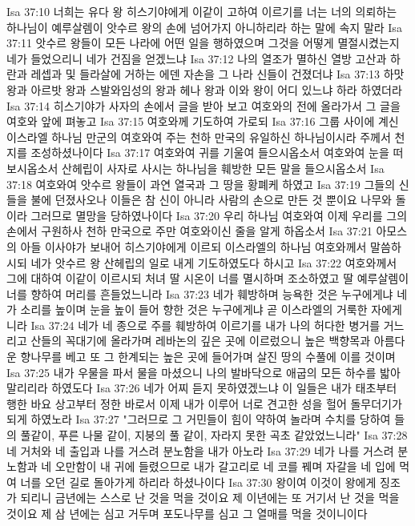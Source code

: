 Isa 37:10  너희는 유다 왕 히스기야에게 이같이 고하여 이르기를 너는 너의 의뢰하는 하나님이 예루살렘이 앗수르 왕의 손에 넘어가지 아니하리라 하는 말에 속지 말라
Isa 37:11  앗수르 왕들이 모든 나라에 어떤 일을 행하였으며 그것을 어떻게 멸절시켰는지 네가 들었으리니 네가 건짐을 얻겠느냐
Isa 37:12  나의 열조가 멸하신 열방 고산과 하란과 레셉과 및 들라살에 거하는 에덴 자손을 그 나라 신들이 건졌더냐
Isa 37:13  하맛 왕과 아르밧 왕과 스발와임성의 왕과 헤나 왕과 이와 왕이 어디 있느냐 하라 하였더라
Isa 37:14  히스기야가 사자의 손에서 글을 받아 보고 여호와의 전에 올라가서 그 글을 여호와 앞에 펴놓고
Isa 37:15  여호와께 기도하여 가로되
Isa 37:16  그룹 사이에 계신 이스라엘 하나님 만군의 여호와여 주는 천하 만국의 유일하신 하나님이시라 주께서 천지를 조성하셨나이다
Isa 37:17  여호와여 귀를 기울여 들으시옵소서 여호와여 눈을 떠 보시옵소서 산헤립이 사자로 사시는 하나님을 훼방한 모든 말을 들으시옵소서
Isa 37:18  여호와여 앗수르 왕들이 과연 열국과 그 땅을 황폐케 하였고
Isa 37:19  그들의 신들을 불에 던졌사오나 이들은 참 신이 아니라 사람의 손으로 만든 것 뿐이요 나무와 돌이라 그러므로 멸망을 당하였나이다
Isa 37:20  우리 하나님 여호와여 이제 우리를 그의 손에서 구원하사 천하 만국으로 주만 여호와이신 줄을 알게 하옵소서
Isa 37:21  아모스의 아들 이사야가 보내어 히스기야에게 이르되 이스라엘의 하나님 여호와께서 말씀하시되 네가 앗수르 왕 산헤립의 일로 내게 기도하였도다 하시고
Isa 37:22  여호와께서 그에 대하여 이같이 이르시되 처녀 딸 시온이 너를 멸시하며 조소하였고 딸 예루살렘이 너를 향하여 머리를 흔들었느니라
Isa 37:23  네가 훼방하며 능욕한 것은 누구에게냐 네가 소리를 높이며 눈을 높이 들어 향한 것은 누구에게냐 곧 이스라엘의 거룩한 자에게니라
Isa 37:24  네가 네 종으로 주를 훼방하여 이르기를 내가 나의 허다한 병거를 거느리고 산들의 꼭대기에 올라가며 레바논의 깊은 곳에 이르렀으니 높은 백향목과 아름다운 향나무를 베고 또 그 한계되는 높은 곳에 들어가며 살진 땅의 수풀에 이를 것이며
Isa 37:25  내가 우물을 파서 물을 마셨으니 나의 발바닥으로 애굽의 모든 하수를 밟아 말리리라 하였도다
Isa 37:26  네가 어찌 듣지 못하였겠느냐 이 일들은 내가 태초부터 행한 바요 상고부터 정한 바로서 이제 내가 이루어 너로 견고한 성을 헐어 돌무더기가 되게 하였노라
Isa 37:27  "그러므로 그 거민들이 힘이 약하여 놀라며 수치를 당하여 들의 풀같이, 푸른 나물 같이, 지붕의 풀 같이, 자라지 못한 곡초 같았었느니라"
Isa 37:28  네 거처와 네 출입과 나를 거스려 분노함을 내가 아노라
Isa 37:29  네가 나를 거스려 분노함과 네 오만함이 내 귀에 들렸으므로 내가 갈고리로 네 코를 꿰며 자갈을 네 입에 먹여 너를 오던 길로 돌아가게 하리라 하셨나이다
Isa 37:30  왕이여 이것이 왕에게 징조가 되리니 금년에는 스스로 난 것을 먹을 것이요 제 이년에는 또 거기서 난 것을 먹을 것이요 제 삼 년에는 심고 거두며 포도나무를 심고 그 열매를 먹을 것이니이다
